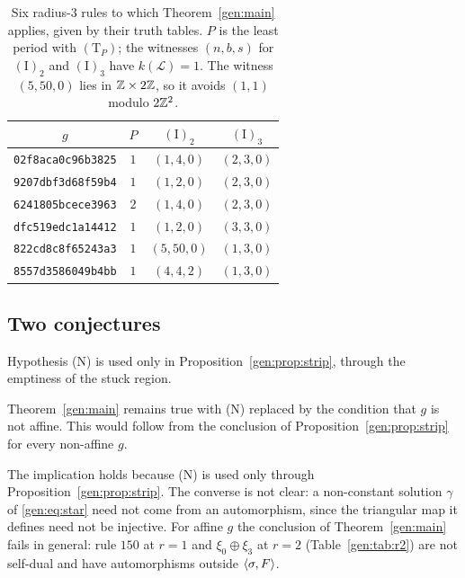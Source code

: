 \begin{table}[ht]
\caption{Six radius-$3$ rules to which Theorem~\ref{gen:main} applies, given by their truth tables. $P$ is the least period with $(\mathrm T_P)$; the witnesses $(n,b,s)$ for $(\mathrm I)_2$ and $(\mathrm I)_3$ have $k(\mathcal L)=1$. The witness $(5,50,0)$ lies in $\mathbb{Z}\times2\mathbb{Z}$, so it avoids $(1,1)$ modulo $2\mathbb{Z}^2$.}
\label{gen:tab:r3}
\centering
\small
\begin{tabular}{cccc}
\toprule
$g$ & $P$ & $(\mathrm I)_2$ & $(\mathrm I)_3$\\
\midrule
\texttt{02f8aca0c96b3825} & $1$ & $(1,4,0)$ & $(2,3,0)$\\
\texttt{9207dbf3d68f59b4} & $1$ & $(1,2,0)$ & $(2,3,0)$\\
\texttt{6241805bcece3963} & $2$ & $(1,4,0)$ & $(2,3,0)$\\
\texttt{dfc519edc1a14412} & $1$ & $(1,2,0)$ & $(3,3,0)$\\
\texttt{822cd8c8f65243a3} & $1$ & $(5,50,0)$ & $(1,3,0)$\\
\texttt{8557d3586049b4bb} & $1$ & $(4,4,2)$ & $(1,3,0)$\\
\bottomrule
\end{tabular}
\end{table}

\subsection{Two conjectures}\label{gen:sec:open}

Hypothesis \textup{(N)} is used only in Proposition~\ref{gen:prop:strip}, through the emptiness of the stuck region.

\begin{conjecture}\label{gen:conj:N}
Theorem~\ref{gen:main} remains true with \textup{(N)} replaced by the condition that $g$ is not affine. This would follow from the conclusion of Proposition~\ref{gen:prop:strip} for every non-affine $g$.
\end{conjecture}

The implication holds because \textup{(N)} is used only through Proposition~\ref{gen:prop:strip}. The converse is not clear: a non-constant solution $\gamma$ of \eqref{gen:eq:star} need not come from an automorphism, since the triangular map it defines need not be injective. For affine $g$ the conclusion of Theorem~\ref{gen:main} fails in general: rule $150$ at $r=1$ and $\xi_0\oplus\xi_3$ at $r=2$ (Table~\ref{gen:tab:r2}) are not self-dual and have automorphisms outside $\langle\sigma,F\rangle$.

